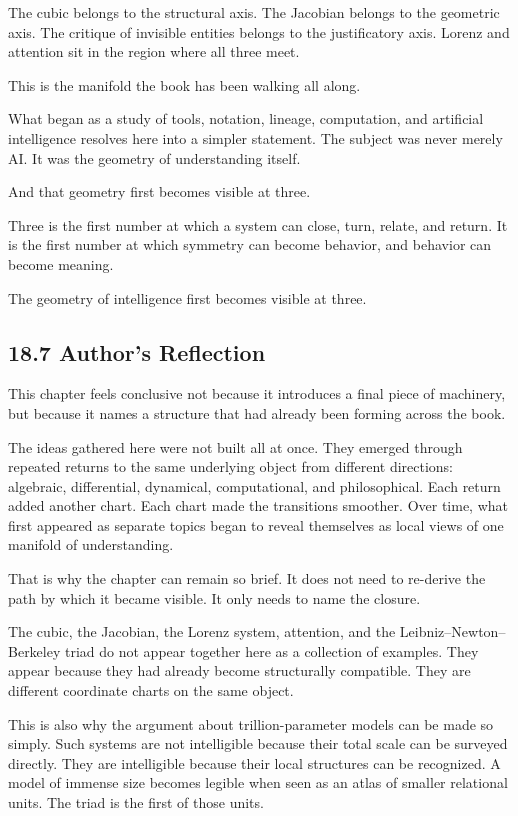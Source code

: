 The cubic belongs to the structural axis. The Jacobian belongs to the
geometric axis. The critique of invisible entities belongs to the
justificatory axis. Lorenz and attention sit in the region where all
three meet.

This is the manifold the book has been walking all along.

What began as a study of tools, notation, lineage, computation, and
artificial intelligence resolves here into a simpler statement. The
subject was never merely AI. It was the geometry of understanding
itself.

And that geometry first becomes visible at three.

Three is the first number at which a system can close, turn, relate, and
return. It is the first number at which symmetry can become behavior,
and behavior can become meaning.

The geometry of intelligence first becomes visible at three.

\hypertarget{authors-reflection-1}{%
\subsection{18.7 Author's Reflection}\label{authors-reflection-1}}

This chapter feels conclusive not because it introduces a final piece of
machinery, but because it names a structure that had already been
forming across the book.

The ideas gathered here were not built all at once. They emerged through
repeated returns to the same underlying object from different
directions: algebraic, differential, dynamical, computational, and
philosophical. Each return added another chart. Each chart made the
transitions smoother. Over time, what first appeared as separate topics
began to reveal themselves as local views of one manifold of
understanding.

That is why the chapter can remain so brief. It does not need to
re-derive the path by which it became visible. It only needs to name the
closure.

The cubic, the Jacobian, the Lorenz system, attention, and the
Leibniz--Newton--Berkeley triad do not appear together here as a
collection of examples. They appear because they had already become
structurally compatible. They are different coordinate charts on the
same object.

This is also why the argument about trillion-parameter models can be
made so simply. Such systems are not intelligible because their total
scale can be surveyed directly. They are intelligible because their
local structures can be recognized. A model of immense size becomes
legible when seen as an atlas of smaller relational units. The triad is
the first of those units.

